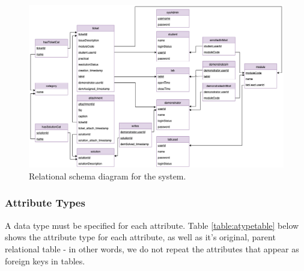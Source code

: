 \begin{figure}[H]
    \centering
    \includegraphics[width=\textwidth]{7design/images/relationalSchema.png}
    \caption{Relational schema diagram for the system.}
    \label{fig:relationalschema}
\end{figure}

\subsubsection{Attribute Types}
A data type must be specified for each attribute. Table \ref{table:atypetable} below shows the attribute type for each attribute, as well as it's original, parent relational table - in other words, we do not repeat the attributes that appear as foreign keys in tables.

